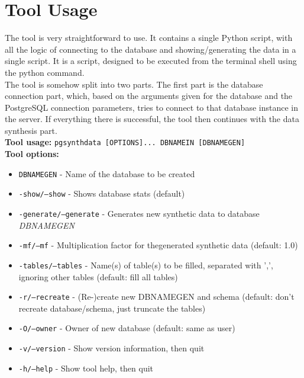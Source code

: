 \section{Tool Usage}
The tool is very straightforward to use. It contains a single Python script, with all the logic of connecting to the database and showing/generating the data in a single script. It is a script, designed to be executed from the terminal shell using the python command.\\
\newline
The tool is somehow split into two parts. The first part is the database connection part, which, based on the arguments given for the database and the PostgreSQL connection parameters, tries to connect to that database instance in the server. If everything there is successful, the tool then continues with the data synthesis part.\\
\newline
\textbf{Tool usage:} \newline
\texttt{pgsynthdata [OPTIONS]... DBNAMEIN [DBNAMEGEN]} \\
\newline
\textbf{Tool options:}
\begin{itemize}
\item \texttt{DBNAMEGEN} - Name of the database to be created
\item \texttt{-show/--show} - Shows database stats (default)
\item \texttt{-generate/--generate} - Generates new synthetic data to database \textit{DBNAMEGEN}
\item \texttt{-mf/--mf} - Multiplication factor for thegenerated synthetic data (default: 1.0)
\item \texttt{-tables/--tables} - Name(s) of table(s) to be filled, separated with ',', ignoring other tables (default: fill all tables)
\item \texttt{-r/--recreate} - (Re-)create new DBNAMEGEN and schema (default: don't recreate database/schema, just truncate the tables)
\item \texttt{-O/--owner} - Owner of new database (default: same as user)
\item \texttt{-v/--version} - Show version information, then quit
\item \texttt{-h/--help} - Show tool help, then quit
\newline
\end{itemize}
